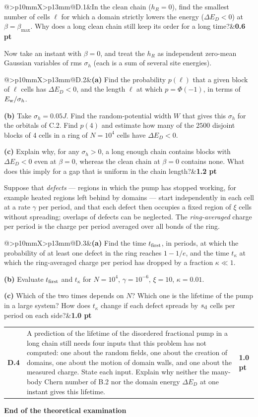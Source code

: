 \documentclass[11pt,a4paper]{article}
\makeatletter
\newcommand{\question}[3]{\begin{tcolorbox}[enhanced,colback=white,colframe=rulegray,boxrule=0.5pt,arc=0pt,left=7pt,right=7pt,top=7pt,bottom=7pt,before skip=9pt,after skip=9pt]\begin{tabularx}{\linewidth}{@{}>{\bfseries}p{10mm}X>{\raggedleft\arraybackslash}p{13mm}@{}}#1&#3&\textbf{#2 pt}\end{tabularx}\end{tcolorbox}}
\makeatother
\begin{document}
\question{D.1}{0.6}{In the clean chain ($h_R=0$), find the smallest number of cells $\ell$ for which a domain strictly lowers the energy ($\Delta E_D<0$) at $\beta=\beta_{\max}$. Why does a long clean chain still keep its order for a long time?}

Now take an instant with $\beta=0$, and treat the $h_R$ as independent zero-mean Gaussian variables of rms $\sigma_h$ (each is a sum of several site energies).

\question{D.2}{1.2}{\textbf{(a)} Find the probability $p(\ell)$ that a given block of $\ell$ cells has $\Delta E_D<0$, and the length $\ell$ at which $p=\Phi(-1)$, in terms of $E_{\rm w}/\sigma_h$.\par
\textbf{(b)} Take $\sigma_h=0.05J$. Find the random-potential width $W$ that gives this $\sigma_h$ for the orbitals of C.2. Find $p(4)$ and estimate how many of the $2500$ disjoint blocks of 4 cells in a ring of $N=10^4$ cells have $\Delta E_D<0$.\par
\textbf{(c)} Explain why, for any $\sigma_h>0$, a long enough chain contains blocks with $\Delta E_D<0$ even at $\beta=0$, whereas the clean chain at $\beta=0$ contains none. What does this imply for a gap that is uniform in the chain length?}

Suppose that \emph{defects} --- regions in which the pump has stopped working, for example heated regions left behind by domains --- start independently in each cell at a rate $\gamma$ per period, and that each defect then occupies a fixed region of $\xi$ cells without spreading; overlaps of defects can be neglected. The \emph{ring-averaged} charge per period is the charge per period averaged over all bonds of the ring.

\question{D.3}{1.0}{\textbf{(a)} Find the time $t_{\rm first}$, in periods, at which the probability of at least one defect in the ring reaches $1-1/e$, and the time $t_\kappa$ at which the ring-averaged charge per period has dropped by a fraction $\kappa\ll1$.\par
\textbf{(b)} Evaluate $t_{\rm first}$ and $t_\kappa$ for $N=10^4$, $\gamma=10^{-6}$, $\xi=10$, $\kappa=0.01$.\par
\textbf{(c)} Which of the two times depends on $N$? Which one is the lifetime of the pump in a large system? How does $t_\kappa$ change if each defect spreads by $s_{\rm d}$ cells per period on each side?}

\question{D.4}{1.0}{A prediction of the lifetime of the disordered fractional pump in a long chain still needs four inputs that this problem has not computed: one about the random fields, one about the creation of domains, one about the motion of domain walls, and one about the measured charge. State each input. Explain why neither the many-body Chern number of B.2 nor the domain energy $\Delta E_D$ at one instant gives this lifetime.}

\vfill
\begin{center}\textbf{End of the theoretical examination}\end{center}
\end{document}
